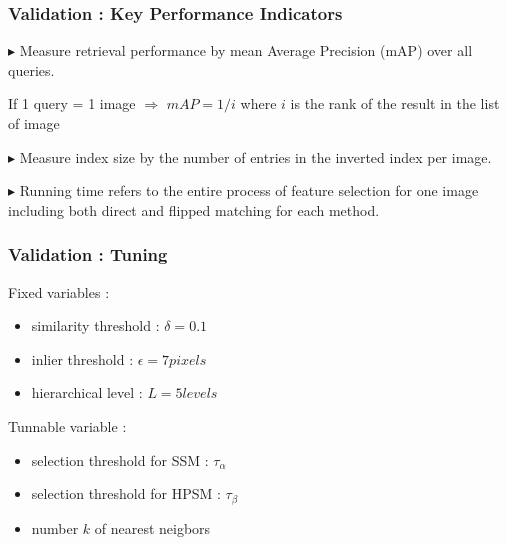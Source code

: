 \documentclass[11pt]{beamer}
\begin{document}
\begin{frame}
\frametitle{Validation : Key Performance Indicators}
$\blacktriangleright$ Measure retrieval performance by mean Average Precision (mAP) over all queries.

\vspace{0.3cm}
If 1 query = 1 image $\Rightarrow$ $mAP = 1/i$ where $i$ is the rank of the result in the list of image

\vspace{0.3cm}
$\blacktriangleright$ Measure index size by the number of entries in the inverted index per image.

\vspace{0.3cm}
$\blacktriangleright$ Running time refers to the entire process of feature selection for one image including both direct and flipped matching for each method.
\end{frame}

\begin{frame}
\frametitle{Validation : Tuning}

Fixed variables :
\begin{itemize}
\item similarity threshold : $\delta = 0.1$
\item inlier threshold : $\epsilon = 7 pixels$
\item hierarchical level : $L = 5 levels$
\end{itemize}

Tunnable variable :
\begin{itemize}
\item selection threshold for SSM : $\tau_\alpha$
\item selection threshold for HPSM : $\tau_\beta$
\item number $k$ of nearest neigbors
\end{itemize}

\end{frame}
\end{document}
